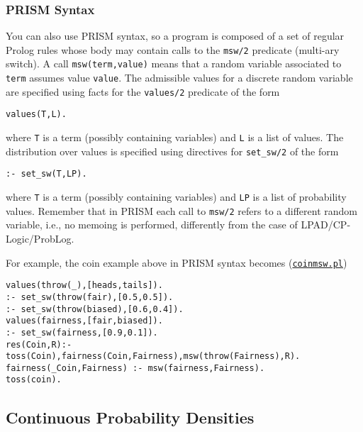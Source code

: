 \subsubsection{PRISM Syntax}
You can also use PRISM \cite{DBLP:conf/ijcai/SatoK97} syntax, so a program is composed of
a set of regular Prolog rules whose body may contain calls to the \verb|msw/2| predicate (multi-ary 
switch). A call \verb|msw(term,value)| means that a random variable associated to \verb|term|
assumes value \verb|value|. The admissible values  for a discrete random variable are 
specified using facts for the \verb|values/2| predicate of the form
\begin{verbatim}
values(T,L).
\end{verbatim}
where \verb|T| is a term (possibly containing variables) and \verb|L| is a list of values.
The distribution over values is specified using directives for \verb|set_sw/2| of the form
\begin{verbatim}
:- set_sw(T,LP).
\end{verbatim}
where \verb|T| is a term (possibly containing variables) and \verb|LP| is a list of
probability values.
Remember that in PRISM each call to \verb|msw/2| refers to a different random
variable, i.e., no memoing is performed, differently from the case of LPAD/CP-Logic/ProbLog.

For example, the coin example above in PRISM syntax becomes
(\href{http://cplint.lamping.unife.it/example/inference/coinmsw.pl}{\texttt{coinmsw.pl}})
\begin{verbatim}
values(throw(_),[heads,tails]).
:- set_sw(throw(fair),[0.5,0.5]).
:- set_sw(throw(biased),[0.6,0.4]).
values(fairness,[fair,biased]).
:- set_sw(fairness,[0.9,0.1]).
res(Coin,R):- toss(Coin),fairness(Coin,Fairness),msw(throw(Fairness),R).
fairness(_Coin,Fairness) :- msw(fairness,Fairness).
toss(coin).
\end{verbatim}
\subsection{Continuous Probability Densities}
\label{cont}

